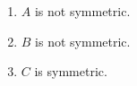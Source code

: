 {\color{solution}
\begin{enumerate}
	\item $A$ is not symmetric.
	\item $B$ is not symmetric.
	\item $C$ is symmetric.
\end{enumerate}
}